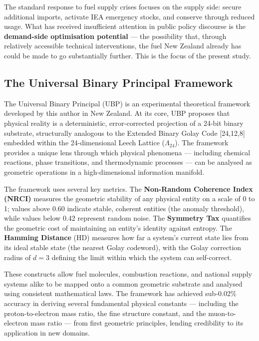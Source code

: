 \documentclass[12pt,a4paper]{article}
\begin{document}
The standard response to fuel supply crises focuses on the supply side: secure
additional imports, activate IEA emergency stocks, and conserve through reduced usage.
What has received insufficient attention in public policy discourse is the
\textbf{demand-side optimisation potential} --- the possibility that, through
relatively accessible technical interventions, the fuel New Zealand already has could
be made to go substantially further. This is the focus of the present study.

\subsection{The Universal Binary Principal Framework}

The Universal Binary Principal (UBP) is an experimental theoretical framework
developed by this author in New Zealand. At its core, UBP proposes that physical
reality is a deterministic, error-corrected projection of a 24-bit binary substrate,
structurally analogous to the Extended Binary Golay Code [24,12,8] embedded within the
24-dimensional Leech Lattice ($\Lambda_{24}$). The framework provides a unique lens
through which physical phenomena --- including chemical reactions, phase transitions,
and thermodynamic processes --- can be analysed as geometric operations in a
high-dimensional information manifold.

The framework uses several key metrics. The \textbf{Non-Random Coherence Index (NRCI)}
measures the geometric stability of any physical entity on a scale of 0 to 1; values
above 0.60 indicate stable, coherent entities (the anomaly threshold), while values
below 0.42 represent random noise. The \textbf{Symmetry Tax} quantifies the geometric
cost of maintaining an entity's identity against entropy. The \textbf{Hamming Distance}
(HD) measures how far a system's current state lies from its ideal stable state (the
nearest Golay codeword), with the Golay correction radius of $d = 3$ defining the
limit within which the system can self-correct.

These constructs allow fuel molecules, combustion reactions, and national supply systems
alike to be mapped onto a common geometric substrate and analysed using consistent
mathematical laws. The framework has achieved sub-0.02\% accuracy in deriving several
fundamental physical constants --- including the proton-to-electron mass ratio, the
fine structure constant, and the muon-to-electron mass ratio --- from first geometric
principles, lending credibility to its application in new domains.
\end{document}
